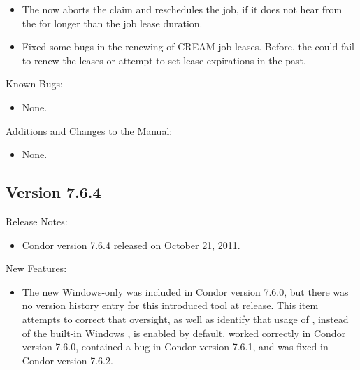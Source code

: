 \begin{itemize}
\item The  now aborts the claim and reschedules the job,
if it does not hear from the  for longer than the job
lease duration.

\item Fixed some bugs in the renewing of CREAM job leases. Before, the
 could fail to renew the leases or attempt to set
lease expirations in the past.

\end{itemize}

\noindent Known Bugs:

\begin{itemize}

\item None.

\end{itemize}

\noindent Additions and Changes to the Manual:

\begin{itemize}

\item None.

\end{itemize}


\subsection*{\label{sec:New-7-6-4}Version 7.6.4}

\noindent Release Notes:

\begin{itemize}

\item Condor version 7.6.4 released on October 21, 2011.

\end{itemize}


\noindent New Features:

\begin{itemize}

\item The new Windows-only  was included in Condor version 7.6.0,
but there was no version history entry for this introduced tool at release.
This item attempts to correct that oversight, 
as well as identify that usage of ,
instead of the built-in Windows , 
is enabled by default.
 worked correctly in Condor version 7.6.0, 
contained a bug in Condor version 7.6.1,
and was fixed in Condor version 7.6.2.


\end{itemize}

